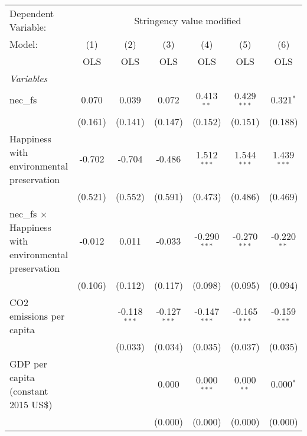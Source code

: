 
\begingroup
\centering
\begin{tabular}{lcccccc}
   \toprule
   Dependent Variable: & \multicolumn{6}{c}{Stringency value modified}\\
   Model:                                                       & (1)     & (2)            & (3)            & (4)            & (5)            & (6)\\  
                                                                &  OLS    & OLS            & OLS            & OLS            & OLS            & OLS\\  
   \midrule
   \emph{Variables}\\
   nec\_fs                                                      & 0.070   & 0.039          & 0.072          & 0.413$^{**}$   & 0.429$^{***}$  & 0.321$^{*}$\\   
                                                                & (0.161) & (0.141)        & (0.147)        & (0.152)        & (0.151)        & (0.188)\\   
   Happiness with environmental preservation                    & -0.702  & -0.704         & -0.486         & 1.512$^{***}$  & 1.544$^{***}$  & 1.439$^{***}$\\   
                                                                & (0.521) & (0.552)        & (0.591)        & (0.473)        & (0.486)        & (0.469)\\   
   nec\_fs $\times$ Happiness with environmental preservation   & -0.012  & 0.011          & -0.033         & -0.290$^{***}$ & -0.270$^{***}$ & -0.220$^{**}$\\   
                                                                & (0.106) & (0.112)        & (0.117)        & (0.098)        & (0.095)        & (0.094)\\   
   CO2 emissions per capita                                     &         & -0.118$^{***}$ & -0.127$^{***}$ & -0.147$^{***}$ & -0.165$^{***}$ & -0.159$^{***}$\\   
                                                                &         & (0.033)        & (0.034)        & (0.035)        & (0.037)        & (0.035)\\   
   GDP per capita (constant 2015 US\$)                          &         &                & 0.000          & 0.000$^{***}$  & 0.000$^{**}$   & 0.000$^{*}$\\   
                                                                &         &                & (0.000)        & (0.000)        & (0.000)        & (0.000)\\   

\end{tabular}
